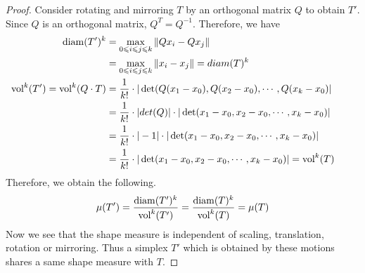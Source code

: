 \begin{proof}
    Consider rotating and mirroring $T$ by an orthogonal matrix $Q$ to obtain $T'$. Since $Q$ is an orthogonal matrix, $Q^T = Q^{-1}$. Therefore, we have
    \begin{align*}
    \operatorname{diam}(T')^k &= \max_{0\leqslant i\leqslant j\leqslant k} \|Qx_i - Qx_j\|\\
               &= \max_{0\leqslant i\leqslant j\leqslant k} \|x_i - x_j\| = diam(T)^k&&\\
    \operatorname{vol}^k(T') = \operatorname{vol}^k(Q\cdot T) &= \frac{1}{k!}\cdot |\det(Q(x_1-x_0), Q(x_2-x_0),\cdots, Q(x_k-x_0)|\\
                                &= \frac{1}{k!}\cdot|det(Q)|\cdot|\det(x_1-x_0, x_2-x_0, \cdots, x_k-x_0)|\\
                                &= \frac{1}{k!}\cdot|-1|\cdot|\det(x_1-x_0, x_2-x_0, \cdots, x_k-x_0)|\\
                                &= \frac{1}{k!}\cdot|\det(x_1-x_0, x_2-x_0, \cdots, x_k-x_0)| = \operatorname{vol}^k(T)
    \end{align*}
    Therefore, we obtain the following.
    \begin{gather*}
    \mu(T') = \frac{\operatorname{diam}(T')^k}{\operatorname{vol}^k(T')} = \frac{\operatorname{diam}(T)^k}{\operatorname{vol}^k(T)} = \mu(T)
    \end{gather*}
    Now we see that the shape measure is independent of scaling, translation, rotation or mirroring. Thus a simplex $T'$ which is obtained by these motions shares a same shape measure with $T$.
    \end{proof}